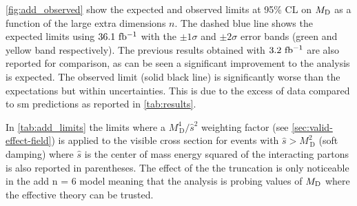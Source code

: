 \cref{fig:add_observed} show the expected and observed limits at 95\% CL on
$M_\mathrm{D}$ as a function of the large extra dimensions $n$. The dashed blue line
shows the expected limits using $36.1~\mbox{fb$^{-1}$}$ with the $\pm 1 \sigma$ and
$\pm 2 \sigma$ error bands (green and yellow band respectively). The previous
results obtained with $3.2~\mbox{fb$^{-1}$}$ are also reported for comparison, as can be
seen a significant improvement to the analysis is expected. The observed limit
(solid black line) is significantly worse than the expectations but within
uncertainties. This is due to the excess of data compared to \gls{sm}
predictions as reported in \cref{tab:results}.

In \cref{tab:add_limits} the limits where a $M^4_\mathrm{\, D} / \hat{s}^2$
weighting factor (see \cref{sec:valid-effect-field}) is applied to the visible
cross section for events with $\hat{s} > M^2_\mathrm{\, D}$ (soft damping) where
$\hat{s}$ is the center of mass energy squared of the interacting partons is
also reported in parentheses. The effect of the the truncation is only
noticeable in the \gls{add} n = 6 model meaning that the analysis is probing
values of $M_\mathrm{D}$ where the effective theory can be trusted.


